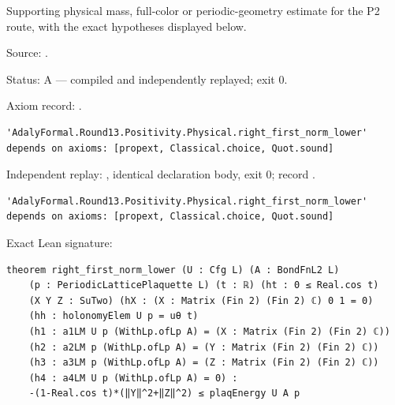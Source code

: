\begin{theorem}[bp-482]
\label{bp-482}
\leanok
Supporting physical mass, full-color or periodic-geometry estimate for the P2 route, with the exact hypotheses displayed below.

\par Source: \texttt{}.
\par Status: A — compiled and independently replayed; exit 0.
\par Axiom record: \texttt{}.
\begin{verbatim}
'AdalyFormal.Round13.Positivity.Physical.right_first_norm_lower' depends on axioms: [propext, Classical.choice, Quot.sound]
\end{verbatim}
\par Independent replay: \texttt{}, identical declaration body, exit 0; record \texttt{}.
\begin{verbatim}
'AdalyFormal.Round13.Positivity.Physical.right_first_norm_lower' depends on axioms: [propext, Classical.choice, Quot.sound]
\end{verbatim}
\par Exact Lean signature:
\begin{verbatim}
theorem right_first_norm_lower (U : Cfg L) (A : BondFnL2 L)
    (p : PeriodicLatticePlaquette L) (t : ℝ) (ht : 0 ≤ Real.cos t)
    (X Y Z : SuTwo) (hX : (X : Matrix (Fin 2) (Fin 2) ℂ) 0 1 = 0)
    (hh : holonomyElem U p = uθ t)
    (h1 : a1LM U p (WithLp.ofLp A) = (X : Matrix (Fin 2) (Fin 2) ℂ))
    (h2 : a2LM p (WithLp.ofLp A) = (Y : Matrix (Fin 2) (Fin 2) ℂ))
    (h3 : a3LM p (WithLp.ofLp A) = (Z : Matrix (Fin 2) (Fin 2) ℂ))
    (h4 : a4LM U p (WithLp.ofLp A) = 0) :
    -(1-Real.cos t)*(‖Y‖^2+‖Z‖^2) ≤ plaqEnergy U A p
\end{verbatim}
\end{theorem}

